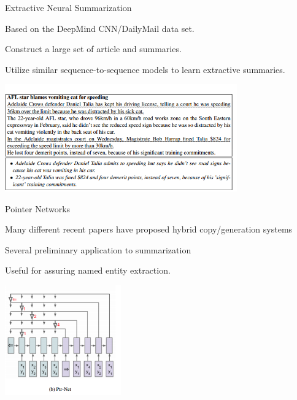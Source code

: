 \documentclass{beamer}
\let\tempone\itemize
\let\temptwo\enditemize
\renewenvironment{itemize}{\tempone\addtolength{\itemsep}{0.5\baselineskip}}{\temptwo}
\newcommand{\Cite}[1]{{\footnotesize \citep{#1}}}
\begin{document}



\begin{frame}{Extractive Neural Summarization \Cite{cheng2016neural}}
  \begin{itemize}
  \item Based on the DeepMind CNN/DailyMail data set. 
  \item Construct a large set of article and summaries.
  \item Utilize similar sequence-to-sequence models to learn extractive summaries.
  \end{itemize}
  \begin{center}
    \includegraphics[width=10cm]{chenglapa}
  \end{center}
\end{frame}


\begin{frame}{Pointer Networks \Cite{2015arXiv150603134V}}
  \begin{itemize}
  \item Many different recent papers have proposed hybrid copy/generation systems
  \item Several preliminary application to summarization \cite{zeng2016efficient}
  \item Useful for assuring named entity extraction.
  \end{itemize}
  \begin{center}
    \includegraphics[width=5cm]{ptrnet}
  \end{center}
\end{frame}
\end{document}
